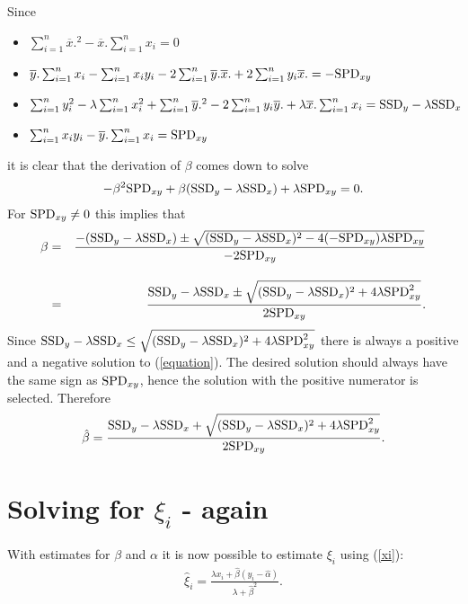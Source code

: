 \documentclass[a4paper,twoside,12pt]{article}
\providecommand{\SSD}{\text{\rm SSD}}
\providecommand{\SPD}{\text{\rm SPD}}
\begin{document}
Since
\begin{itemize}
\item
$\sum_{i=1}^n\overline{x}.^2
-\overline{x}.\sum_{i=1}^nx_i=0$
\item
$\overline{y}.\sum_{i=1}^nx_i
-\sum_{i=1}^nx_iy_i
-2\sum_{i=1}^n\overline{y}.\overline{x}.
+2\sum_{i=1}^ny_i\overline{x}.=-\SPD_{xy}$
\item
$\sum_{i=1}^ny_i^2
-\lambda\sum_{i=1}^nx_i^2
+\sum_{i=1}^n\overline{y}.^2
-2\sum_{i=1}^ny_i\overline{y}.
+\lambda\overline{x}.\sum_{i=1}^nx_i
=\SSD_y-\lambda\SSD_x$
\item
$\sum_{i=1}^nx_iy_i
-\overline{y}.\sum_{i=1}^nx_i=\SPD_{xy}$
\end{itemize}
it is clear that the derivation of $\beta$ comes down to solve
\begin{eqnarray}\label{equation}
-\beta^2\SPD_{xy}+\beta(\SSD_y-\lambda\SSD_x)+\lambda\SPD_{xy}=0.
\end{eqnarray}
For $\SPD_{xy}\neq 0$ this implies that
\begin{eqnarray*}
\beta
&=&
\frac{-(\SSD_y-\lambda\SSD_x)\pm\sqrt{(\SSD_y-\lambda\SSD_x)^2-4(-\SPD_{xy})\lambda\SPD_{xy}}}{-2\SPD_{xy}}\\[1em]
&=&
\frac{\SSD_y-\lambda\SSD_x\pm\sqrt{(\SSD_y-\lambda\SSD_x)^2+4\lambda\SPD_{xy}^2}}{2\SPD_{xy}}.
\end{eqnarray*}
Since $\SSD_y-\lambda\SSD_x\leq
\sqrt{(\SSD_y-\lambda\SSD_x)^2+4\lambda\SPD_{xy}^2}$ there is always a
positive and a negative solution to (\ref{equation}). The desired solution should always have the same sign as $\SPD_{xy}$, hence the solution with the positive numerator is selected. Therefore
\begin{eqnarray*}
\hat{\beta}=\frac{\SSD_y-\lambda\SSD_x+\sqrt{(\SSD_y-\lambda\SSD_x)^2+4\lambda\SPD_{xy}^2}}{2\SPD_{xy}}.
\end{eqnarray*}



\section{Solving for $\xi_i$ - again}
With estimates for $\beta$ and $\alpha$ it is now possible to estimate $\xi_i$ using (\ref{xi}):
\begin{eqnarray*}
\hat{\xi}_i=\frac{\lambda x_i+\hat{\beta}(y_i-\hat{\alpha})}{\lambda+\hat{\beta}^2}.
\end{eqnarray*}
\end{document}
